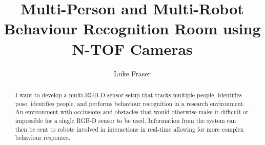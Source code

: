\documentclass[12pt,a4paper]{article}
\author{Luke Fraser}
\title{Multi-Person and Multi-Robot Behaviour Recognition Room using N-TOF Cameras}
\begin{document}
\maketitle
\begin{abstract}
I want to develop a multi-RGB-D sensor setup that tracks multiple people, Identifies pose, identifies people, and performs behaviour recognition in a research environment. An environment with occlusions and obstacles that would otherwise make it difficult or impossible for a single RGB-D sensor to be used. Information from the system can then be sent to robots involved in interactions in real-time allowing for more complex behaviour responses.
\end{abstract}
\end{document}
